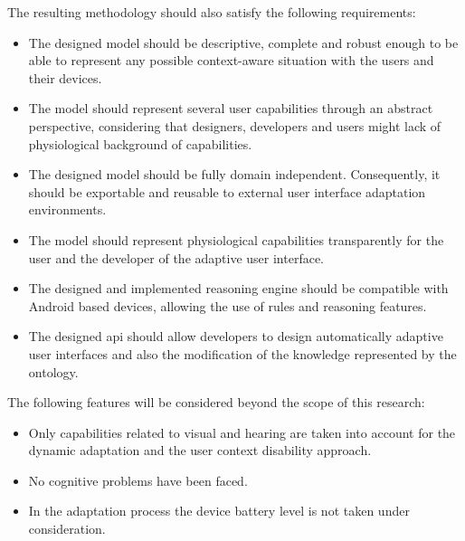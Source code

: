The resulting methodology should also satisfy the following requirements:

\begin{itemize}
  \item The designed model should be descriptive, complete and robust enough to
  be able to represent any possible context-aware situation with the users and
  their devices.
  
  \item The model should represent several user capabilities through an abstract 
  perspective, considering that designers, developers and users might lack of 
  physiological background of capabilities.
  
  \item The designed model should be fully domain independent. Consequently, it
  should be exportable and reusable to external user interface adaptation 
  environments.
  
  \item The model should represent physiological capabilities transparently for
  the user and the developer of the adaptive user interface.
  
  \item The designed and implemented reasoning engine should be compatible with
  Android based devices, allowing the use of rules and reasoning features.
  
  \item The designed \ac{api} should allow developers to design automatically
  adaptive user interfaces and also the modification of the knowledge 
  represented by the ontology.
\end{itemize}

The following features will be considered beyond the scope of this research:

\begin{itemize}
  \item Only capabilities related to visual and hearing are taken into account
  for the dynamic adaptation and the user context disability approach. 
  
  \item No cognitive problems have been faced.
  
  \item In the adaptation process the device battery level is not taken under
  consideration.
\end{itemize}
